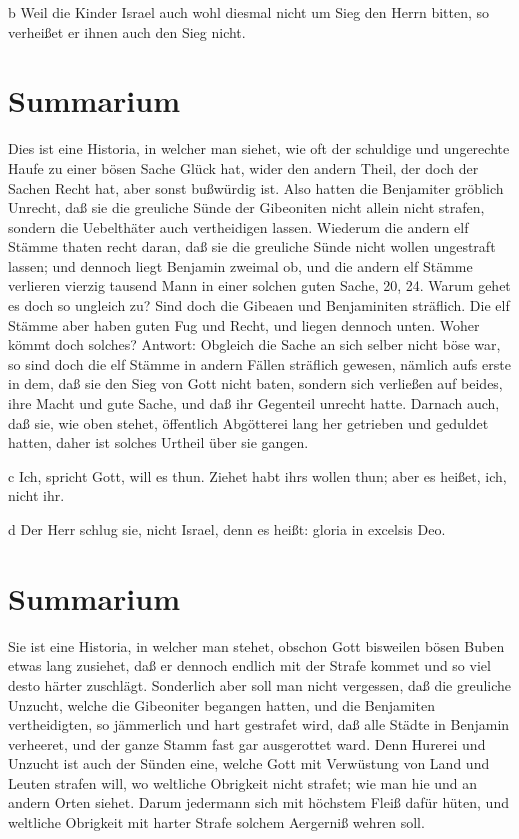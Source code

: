 b Weil die Kinder Israel auch wohl diesmal nicht um Sieg den Herrn bitten, so verheißet er ihnen auch den Sieg nicht.

\section{Summarium}

Dies ist eine Historia, in welcher man siehet, wie oft der schuldige und ungerechte Haufe zu einer bösen Sache Glück hat, wider den andern Theil, der doch der Sachen Recht hat, aber sonst bußwürdig ist. Also hatten die Benjamiter gröblich Unrecht, daß sie die greuliche Sünde der Gibeoniten nicht allein nicht strafen, sondern die Uebelthäter auch vertheidigen lassen. Wiederum die andern elf Stämme thaten recht daran, daß sie die greuliche Sünde nicht wollen ungestraft lassen; und dennoch liegt Benjamin zweimal ob, und die andern elf Stämme verlieren vierzig tausend Mann in einer solchen
guten Sache, 20, 24. Warum gehet es doch so ungleich zu? Sind doch die Gibeaen und Benjaminiten sträflich. Die elf Stämme aber haben guten Fug und Recht, und liegen dennoch unten. Woher kömmt doch solches? Antwort: Obgleich die Sache an sich selber nicht böse war, so sind doch die elf Stämme in andern Fällen sträflich gewesen, nämlich aufs erste in dem, daß sie den Sieg von Gott nicht baten, sondern sich verließen auf beides, ihre Macht und gute Sache, und daß ihr Gegenteil unrecht hatte. Darnach auch, daß sie, wie oben stehet, öffentlich Abgötterei lang her getrieben und geduldet hatten, daher ist solches Urtheil über sie gangen.

c Ich, spricht Gott, will es thun. Ziehet habt ihrs wollen thun; aber es heißet, ich, nicht ihr.

d Der Herr schlug sie, nicht Israel, denn es heißt: gloria in excelsis Deo.
\section{Summarium}

Sie ist eine Historia, in welcher man stehet, obschon Gott bisweilen bösen Buben etwas lang zusiehet, daß er dennoch endlich mit der Strafe kommet und so viel desto härter zuschlägt. Sonderlich aber soll man nicht vergessen, daß die greuliche Unzucht, welche die Gibeoniter begangen hatten, und die Benjamiten vertheidigten, so jämmerlich und hart gestrafet wird, daß alle Städte in Benjamin verheeret, und der ganze Stamm fast gar ausgerottet ward. Denn Hurerei und Unzucht ist auch der Sünden eine, welche Gott mit Verwüstung von Land und Leuten strafen will, wo weltliche Obrigkeit nicht strafet; wie man hie und an andern Orten siehet. Darum jedermann sich mit höchstem Fleiß dafür hüten, und weltliche Obrigkeit mit harter Strafe solchem Aergerniß wehren soll.

